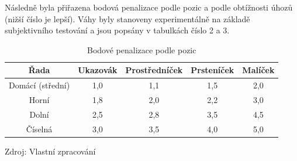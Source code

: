 \documentclass[a4paper, twoside, 12pt, czech]{article}
\begin{document}
Následně byla přiřazena bodová penalizace podle pozic a podle obtížnosti úhozů 
(nižší číslo je lepší). Váhy byly stanoveny experimentálně na základě subjektivního 
testování a jsou popsány v tabulkách číslo 2 a 3.
\begin{table}[h!]
    \centering
    \caption{Bodové penalizace podle pozic}
    \vspace{0.5cm}
\begin{tabular}{|c|c|c|c|c|}
\hline
\textbf{Řada}    & \textbf{Ukazovák}   & \textbf{Prostředníček} & \textbf{Prsteníček} &\textbf{Malíček} \\ \hline
Domácí (střední) & 1,0                 & 1,1                    & 1,5               & 2,0               \\ \hline
Horní            & 1,8                 & 2,0                    & 2,2               & 3,0               \\ \hline
Dolní            & 2,5                 & 2,8                    & 3,5               & 4,5               \\ \hline
Číselná          & 3,0                 & 3,5                    & 4,0               & 5,0            \\ \hline
\end{tabular}

\vspace{0.2cm}
\small{Zdroj: Vlastní zpracování}
\label{table:pozicnipenale}
\end{table}
\end{document}
